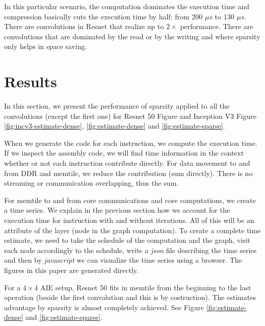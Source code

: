\documentclass[conference]{IEEEtran}
\begin{document}
In this particular scenario, the computation dominates the execution
time and compression basically cuts the execution time by half: from
200 $\mu s$ to 130 $\mu s$. There are convolutions in Resnet that
realize up to $2\times$ performance. There are convolutions that are
dominated by the read or by the writing and where sparsity only helps
in space saving.


\section{Results}
\label{sec:experiments}
In this section, we present the performance of sparsity applied to all
the convolutions (except the first one) for Resnet 50 Figure and
Inception V3 Figure \ref{fig:incv3-estimate-dense},
\ref{fig:estimate-dense} and \ref{fig:estimate-sparse}.


When we generate the code for each instruction, we compute the
execution time. If we inspect the assembly code, we will find time
information in the context whether or not each instruction contribute
directly. For data movement to and from DDR and memtile, we reduce the
contribution (sum directly). There is no streaming or communication
overlapping, thus the sum.

For memtile to and from core communications and core computations, we
create a time series. We explain in the previous section how we
account for the execution time for instruction with and without
iterations. All of this will be an attribute of the layer (node in the
graph computation).  To create a complete time estimate, we need to
take the schedule of the computation and the graph, visit each node
accordingly to the schedule, write a {\em json} file describing the
time series and then by {\em javascript} we can visualize the time
series using a browser. The figures in this paper are generated
directly.

For a $4\times 4$ AIE setup, Resnet 50 fits in memtile from the
beginning to the last operation (beside the first convolution and this
is by costruction). The estimates advantage by sparsity is almost
completely achieved.  See Figure \ref{fig:estimate-dense} and
\ref{fig:estimate-sparse}.
\end{document}
